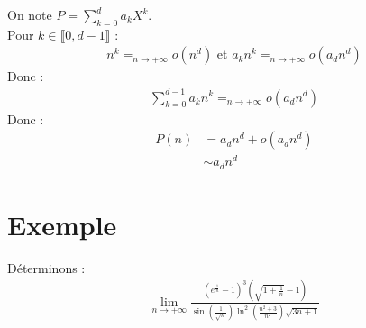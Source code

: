 \documentclass[../main.tex]{subfiles}
\begin{document}
\noindent On note $P = \sum\limits_{k=0}^d a_k X^k$. \\
Pour $k\in \llbracket 0, d-1 \rrbracket$ : 
\begin{align*}
    n^k =_{n\to +\infty} o(n^d) \text{ et } a_k n^k =_{n\to +\infty} o(a_d n^d)
\end{align*}
Donc :
\begin{align*}
    \sum_{k=0}^{d-1} a_k n^k =_{n\to +\infty} o(a_d n^d)
\end{align*}
Donc : 
\begin{align*}
    P(n) &= a_d n^d + o(a_d n^d) \\
    &\sim a_d n^d
\end{align*}

\section{Exemple}
\begin{tcolorbox}[title=Exemple 24.31, title filled=false, colframe=darkgreen, colback=darkgreen!10!white]
    Déterminons : 
    \begin{align*}
        \lim_{n\to +\infty} \frac{\left(e^{\frac{1}{n}}-1\right)^3 \left(\sqrt{1+\frac{1}{n}}-1\right)}{\sin\left(\frac{1}{\sqrt{n}}\right)\ln^2\left(\frac{n^2+3}{n^2}\right)\sqrt{3n+1}} 
    \end{align*}
\end{tcolorbox}
\end{document}
